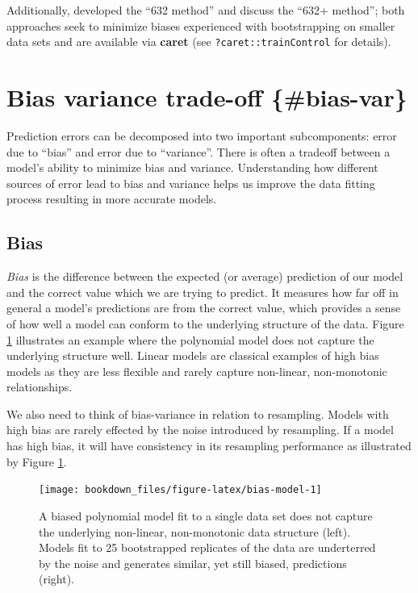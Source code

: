 \documentclass[]{krantz}
\begin{document}
Additionally, \citet{efron1983estimating} developed the ``632 method'' and \citet{efron1997improvements} discuss the ``632+ method''; both approaches seek to minimize biases experienced with bootstrapping on smaller data sets and are available via \textbf{caret} (see \texttt{?caret::trainControl} for details).

\hypertarget{bias-variance-trade-off-bias-var}{%
\section{\texorpdfstring{Bias variance trade-off \{\#bias-var\}}{Bias variance trade-off \{\#bias-var\}}}\label{bias-variance-trade-off-bias-var}}

Prediction errors can be decomposed into two important subcomponents: error due to ``bias'' and error due to ``variance''. There is often a tradeoff between a model's ability to minimize bias and variance. Understanding how different sources of error lead to bias and variance helps us improve the data fitting process resulting in more accurate models.

\hypertarget{bias}{%
\subsection{Bias}\label{bias}}

\emph{Bias} is the difference between the expected (or average) prediction of our model and the correct value which we are trying to predict. It measures how far off in general a model's predictions are from the correct value, which provides a sense of how well a model can conform to the underlying structure of the data. Figure \ref{fig:bias-model} illustrates an example where the polynomial model does not capture the underlying structure well. Linear models are classical examples of high bias models as they are less flexible and rarely capture non-linear, non-monotonic relationships.

We also need to think of bias-variance in relation to resampling. Models with high bias are rarely effected by the noise introduced by resampling. If a model has high bias, it will have consistency in its resampling performance as illustrated by Figure \ref{fig:bias-model}.

\begin{figure}

{\centering \texttt{[image: bookdown\_files/figure-latex/bias-model-1]} 

}

\caption{A biased polynomial model fit to a single data set does not capture the underlying non-linear, non-monotonic data structure (left).  Models fit to 25 bootstrapped replicates of the data are underterred by the noise and generates similar, yet still biased, predictions (right).}\label{fig:bias-model}
\end{figure}
\end{document}
